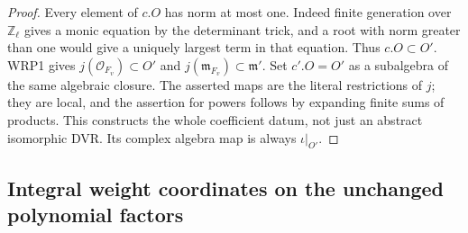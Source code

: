 \documentclass[11pt,a4paper]{article}
\numberwithin{equation}{section}
\theoremstyle{remark}\newtheorem{remark}[theorem]{Remark}
\begin{document}
\begin{proof}
Every element of $c.O$ has norm at most one.  Indeed finite
generation over $\mathbb Z_\ell$ gives a monic equation by
the determinant trick, and a root with norm greater than one
would give a uniquely largest term in that equation.  Thus
$c.O\subset O'$.  WRP1 gives $j(\mathcal O_{F_v})\subset O'$
and $j(\mathfrak m_{F_v})\subset\mathfrak m'$.  Set
$c'.O=O'$ as a subalgebra of the same algebraic closure.
The asserted maps are the literal restrictions of $j$;
they are local, and the assertion for powers follows by
expanding finite sums of products.  This constructs the
whole coefficient datum, not just an abstract isomorphic
DVR.  Its complex algebra map is always $\iota|_{O'}$.
\end{proof}

\subsection{Integral weight coordinates on the unchanged polynomial factors}

\end{document}
